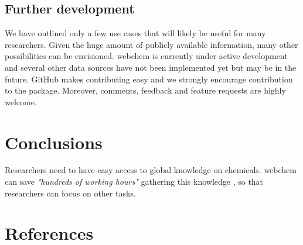 \subsection[Further development]{Further development}
We have outlined only a few use cases that will likely be useful for many researchers.
Given the huge amount of publicly available information, many other possibilities can be envisioned.
webchem is currently under active development and several other data sources have not been implemented yet but may be in the future.
GitHub makes contributing easy and we strongly encourage contribution to the package.
Moreover, comments, feedback and feature requests are highly welcome.


\section[Conclusions]{Conclusions}
Researchers need to have easy access to global knowledge on chemicals.
webchem can save \emph{"hundreds of working hours"} gathering this knowledge \citep{munchalizia2016}, so that researchers can focus on other tasks.



\newpage
\section{References}
\printbibliography[heading=none]
